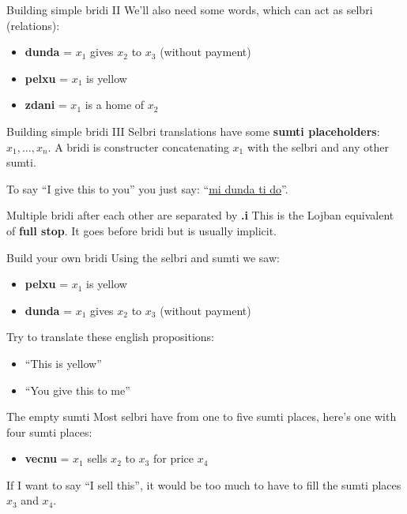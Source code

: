 \begin{frame}{Building simple bridi II}
    We'll also need some words, which can act as selbri (relations):
    \begin{itemize}
        \item \textbf{dunda} = $x_1$ gives $x_2$ to $x_3$ (without payment)
        \item \textbf{pelxu} = $x_1$ is yellow
        \item \textbf{zdani} = $x_1$ is a home of $x_2$
    \end{itemize}
\end{frame}

\begin{frame}{Building simple bridi III}
    Selbri translations have some \textbf{sumti placeholders}: \(x_1, \ldots, x_n\). A bridi is constructer concatenating $x_1$ with the selbri and any other sumti.

    To say ``I give this to you'' you just say: ``\underline{mi dunda ti do}''.

    Multiple bridi after each other are separated by \textbf{.i} This is the Lojban equivalent of \textbf{full stop}. It goes before bridi but is usually implicit.
\end{frame}

\begin{frame}{Build your own bridi}
    Using the selbri and sumti we saw:
    \begin{itemize}
        \item \textbf{pelxu} = $x_1$ is yellow
        \item \textbf{dunda} = $x_1$ gives $x_2$ to $x_3$ (without payment)
    \end{itemize}

    Try to translate these english propositions:
    \begin{itemize}
        \item<2-> ``This is yellow''
        \item<3-> ``You give this to me''
    \end{itemize}
\end{frame}

\begin{frame}{The empty sumti}
    Most selbri have from one to five sumti places, here's one with four sumti places:
    \begin{itemize}
        \item \textbf{vecnu} = $x_1$ sells $x_2$ to $x_3$ for price $x_4$
    \end{itemize}

    \pause
    If I want to say ``I sell this'', it would be too much to have to fill the sumti places $x_3$ and $x_4$.
\end{frame}

